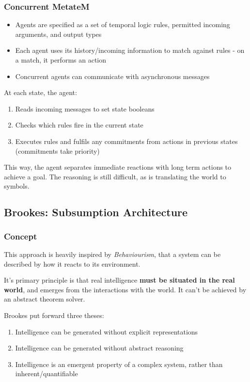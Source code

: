 \subsubsection{Concurrent MetateM}
\begin{itemize}
    \item Agents are specified as a set of temporal logic rules, permitted incoming arguments, and output types
    \item Each agent uses its history/incoming information to match against rules - on a match, it performs an action
    \item Concurrent agents can communicate with asynchronous messages
\end{itemize} 

At each state, the agent:
\begin{enumerate}
    \item Reads incoming messages to set state booleans
    \item Checks which rules fire in the current state
    \item Executes rules and fulfils any commitments from actions in previous states (commitments take priority)
\end{enumerate} 

This way, the agent separates immediate reactions with long term actions to achieve a goal. The reasoning is still difficult, as is translating the world to symbols. 

\subsection{Brookes: Subsumption Architecture}

\subsubsection{Concept}
This approach is heavily inspired by \emph{Behaviourism}, that a system can be described by how it reacts to its environment. 

It's primary principle is that real intelligence \textbf{must be situated in the real world}, and emerges from the interactions with the world. It can't be achieved by an abstract theorem solver.

Brookes put forward three theses:
\begin{enumerate}
    \item Intelligence can be generated without explicit representations
    \item Intelligence can be generated without abstract reasoning
    \item Intelligence is an emergent property of a complex system, rather than inherent/quantifiable
\end{enumerate}

